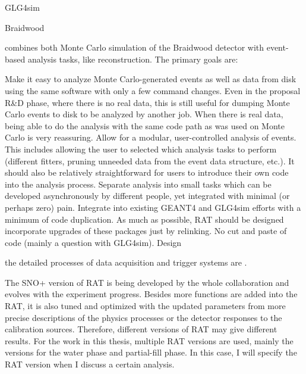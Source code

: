 GLG4sim


Braidwood

combines both Monte Carlo simulation of the Braidwood detector with event-based analysis tasks, like reconstruction. The primary goals are:

Make it easy to analyze Monte Carlo-generated events as well as data from disk using the same software with only a few command changes. Even in the proposal R\&D phase, where there is no real data, this is still useful for dumping Monte Carlo events to disk to be analyzed by another job. When there is real data, being able to do the analysis with the same code path as was used on Monte Carlo is very reassuring.
Allow for a modular, user-controlled analysis of events. This includes allowing the user to selected which analysis tasks to perform (different fitters, pruning unneeded data from the event data structure, etc.). It should also be relatively straightforward for users to introduce their own code into the analysis process.
Separate analysis into small tasks which can be developed asynchronously by different people, yet integrated with minimal (or perhaps zero) pain.
Integrate into existing GEANT4 and GLG4sim efforts with a minimum of code duplication. As much as possible, RAT should be designed incorporate upgrades of these packages just by relinking. No cut and paste of code (mainly a question with GLG4sim).
Design

the detailed processes of data acquisition and trigger systems are \cite{whitepaper}.

The SNO+ version of RAT is being developed by the whole collaboration and evolves with the experiment progress.
Besides more functions are added into the RAT, it is also tuned and optimized with the updated parameters from more precise descriptions of the physics processes or the detector responses to the calibration sources. Therefore, different versions of RAT may give different results. For the work in this thesis, multiple RAT versions are used, mainly the versions for the water phase and partial-fill phase. In this case, I will specify the RAT version when I discuss a certain analysis.
\cite{ratManual}
